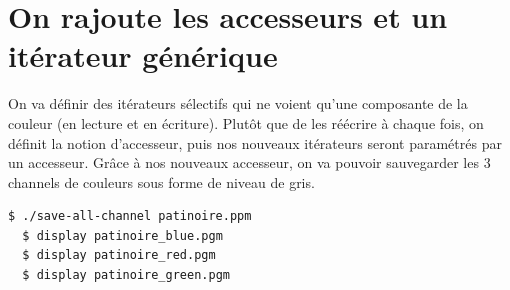 \documentclass[a4paper,10pt]{article}
\begin{document}
    \section{On rajoute les accesseurs et un itérateur générique}
    On va définir des itérateurs sélectifs qui ne voient qu'une composante de la couleur (en lecture et en écriture). Plutôt que de les réécrire à chaque fois, on définit la notion d'accesseur, puis nos nouveaux itérateurs seront paramétrés par un accesseur. Grâce à nos nouveaux accesseur, on va pouvoir sauvegarder les 3 channels de couleurs sous forme de niveau de gris.
    \begin{lstlisting}[language=Bash]
  $ ./save-all-channel patinoire.ppm
  $ display patinoire_blue.pgm
  $ display patinoire_red.pgm
  $ display patinoire_green.pgm
  \end{lstlisting}
\end{document}
